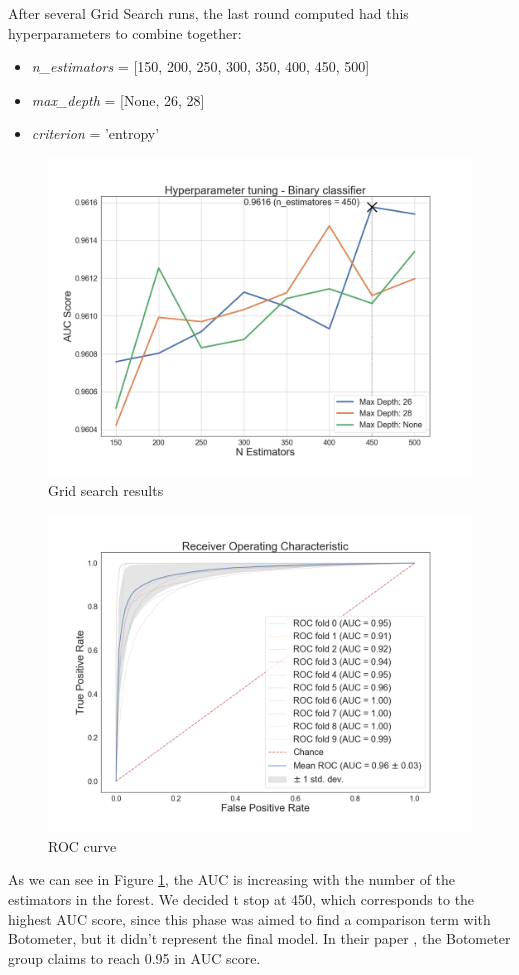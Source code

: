 After several Grid Search runs, the last round computed had this hyperparameters to combine together:
\begin{itemize}
	\item[\PencilRight] \textit{n\_estimators} = [150, 200, 250, 300, 350, 400, 450, 500]
	\item[\PencilRight]\textit{max\_depth} = [None, 26, 28]
	\item[\PencilRight]\textit{criterion} = 'entropy'
\end{itemize}
\begin{figure}[htp!]
	\centering
	\includegraphics[width=\columnwidth]{chapter5/figure/bon_tuning.png}
	\caption{Grid search results}
	\label{fig:grid_search}
\end{figure}
\begin{figure}[htp!]
	\centering
	\includegraphics[width=\columnwidth]{chapter5/figure/auc.png}
	\caption{ROC curve}
	\label{fig:auc}
\end{figure}
As we can see in Figure \ref{fig:grid_search}, the AUC is increasing with the number of the estimators in the forest. We decided t stop at 450, which corresponds to the highest AUC score, since this phase was aimed to find a comparison term with Botometer, but it didn't represent the final model.
In their paper \cite{Varol}, the Botometer group claims to reach 0.95 in AUC score.

